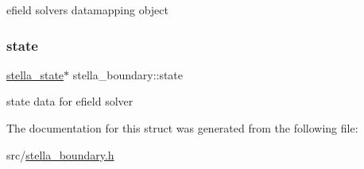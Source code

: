 efield solver\textquotesingle{}s datamapping object 

\mbox{\label{structstella__boundary_ae7b56bc4c6920cc10b7a433814d97713}} 
\subsubsection{\texorpdfstring{state}{state}}
{\footnotesize\ttfamily \mbox{\hyperlink{structstella__state}{stella\+\_\+state}}$\ast$ stella\+\_\+boundary\+::state}



state data for efield solver 



The documentation for this struct was generated from the following file\+:\begin{DoxyCompactItemize}
\item 
src/\mbox{\hyperlink{stella__boundary_8h}{stella\+\_\+boundary.\+h}}\end{DoxyCompactItemize}
